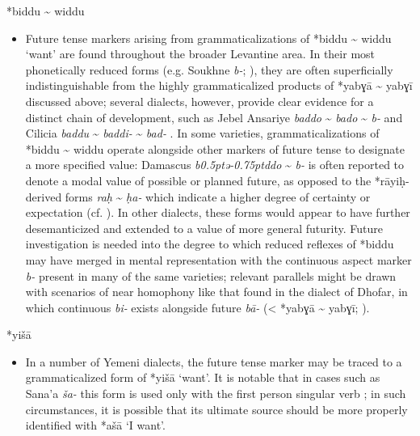 \documentclass[output=paper]{langsci/langscibook}
\begin{document}
*biddu {\textasciitilde} widdu

\begin{itemize}

  \item[]
Future tense markers arising from grammaticalizations of *biddu {\textasciitilde} widdu ‘want’ are found throughout the broader Levantine area. In their most phonetically reduced forms (e.g. Soukhne \textit{b-}; \citealt{Behnstedt1994Soukhne}), they are often superficially indistinguishable from the highly grammaticalized products of *yabɣā {\textasciitilde} yabɣī discussed above; several dialects, however, provide clear evidence for a distinct chain of development, such as Jebel Ansariye \textit{baddo} {\textasciitilde} \textit{bado} {\textasciitilde} \textit{b-} \citep{Lewin1969} and Cilicia \textit{baddu} {\textasciitilde} \textit{baddi-} {\textasciitilde} \textit{bad-} \citep{Procházka2011Cilician}. In some varieties, grammaticalizations of *biddu {\textasciitilde} widdu operate alongside other markers of future tense to designate a more specified value: Damascus \textit{b\kern 0.5ptǝ\kern -0.75ptddo} {\textasciitilde} \textit{b-} is often reported to denote a modal value of possible or planned future, as opposed to the *rāyiḥ{}-derived forms \textit{raḥ} {\textasciitilde} \textit{ḥa-} which indicate a higher degree of certainty or expectation (cf. \citealt{Lentin2011Damascus}). In other dialects, these forms would appear to have further desemanticized and extended to a value of more general futurity.  Future investigation is needed into the degree to which reduced reflexes of *biddu may have merged in mental representation with the continuous aspect marker \textit{b-} present in many of the same varieties; relevant parallels might be drawn with scenarios of near homophony like that found in the dialect of Dhofar, in which continuous \textit{bi-} exists alongside future \textit{bā}\textit{{}-} (< *yabɣā {\textasciitilde} yabɣī; \citealt{Davey2016}).
\end{itemize}
 
*yišā

\begin{itemize}

  \item[]
In a number of Yemeni dialects, the future tense marker may be traced to a grammaticalized form of *yišā ‘want’. It is notable that in cases such as Sana’a \textit{ša-} this form is used only with the first person singular verb \citep{Watson1993}; in such circumstances, it is possible that its ultimate source should be more properly identified with *ašā ‘I want’.
\end{itemize}
 
\end{document}
